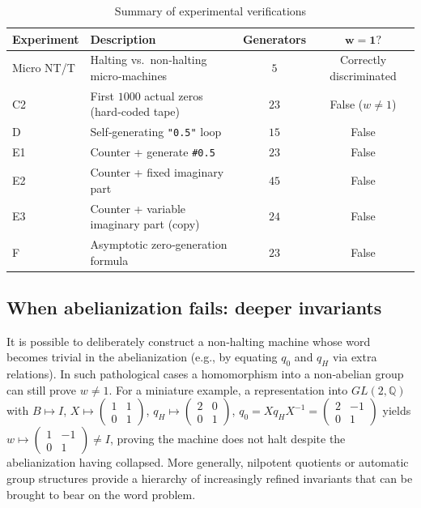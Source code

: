 \documentclass[11pt,a4paper]{article}
\begin{document}
\begin{table}[ht]
\centering
\caption{Summary of experimental verifications}
\label{tab:experiments}
\begin{tabular}{@{}p{2.3cm} p{5.5cm} c c @{}}
\toprule
\textbf{Experiment} & \textbf{Description} & \textbf{Generators} & \(\boldsymbol{w = 1?}\) \\
\midrule
Micro NT/T & Halting vs.\ non‑halting micro‑machines & $5$ & Correctly discriminated \\
C2 & First $1000$ actual zeros (hard‑coded tape) & $23$ & False (\(w \neq 1\)) \\
D & Self‑generating \texttt{"0.5"} loop & $15$ & False \\
E1 & Counter + generate \texttt{\#0.5} & $23$ & False \\
E2 & Counter + fixed imaginary part & $45$ & False \\
E3 & Counter + variable imaginary part (copy) & $24$ & False \\
F & Asymptotic zero‑generation formula & $23$ & False \\
\bottomrule
\end{tabular}
\end{table}

\subsection{When abelianization fails: deeper invariants}
It is possible to deliberately construct a non‑halting machine whose word becomes trivial in the abelianization (e.g., by equating \(q_0\) and \(q_H\) via extra relations). In such pathological cases a homomorphism into a non‑abelian group can still prove \(w \neq 1\). For a miniature example, a representation into \(GL(2,\mathbb{Q})\) with
\(B \mapsto I\), \(X \mapsto \begin{pmatrix}1&1\\0&1\end{pmatrix}\), \(q_H \mapsto \begin{pmatrix}2&0\\0&1\end{pmatrix}\), \(q_0 = X q_H X^{-1} = \begin{pmatrix}2&-1\\0&1\end{pmatrix}\)
yields \(w \mapsto \begin{pmatrix}1&-1\\0&1\end{pmatrix} \neq I\), proving the machine does not halt despite the abelianization having collapsed. More generally, nilpotent quotients or automatic group structures provide a hierarchy of increasingly refined invariants that can be brought to bear on the word problem.
\end{document}
